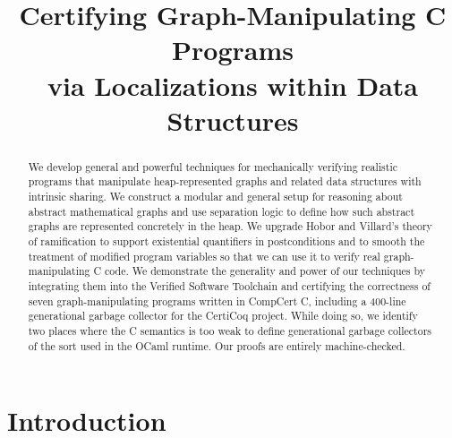 \documentclass[sigplan,10pt,anonymous]{acmart}\settopmatter{printfolios=true,printccs=false,printacmref=false}
\begin{document}
\setlength{\pdfpageheight}{\paperheight}
\setlength{\pdfpagewidth}{\paperwidth}

%
%

\title{Certifying Graph-Manipulating C Programs \\ via Localizations within Data Structures}

\begin{abstract}
We develop general and powerful techniques for mechanically verifying realistic programs that 
manipulate heap-represented graphs and related data structures with intrinsic sharing.
We construct a modular and general setup for reasoning about abstract mathematical graphs
and use separation logic to define how such abstract graphs are represented concretely in 
the heap.  We upgrade Hobor and Villard's theory of ramification to support existential 
quantifiers in postconditions and to smooth the treatment of modified program variables
so that we can use it to verify real graph-manipulating C code.  We demonstrate the generality 
and power of our techniques by integrating them into the Verified Software Toolchain and
certifying the correctness of seven graph-manipulating programs written in CompCert C, including 
a 400-line generational garbage collector for the CertiCoq project.  While doing so, we identify
two places where the C semantics is too weak to define generational garbage collectors of the 
sort used in the OCaml runtime.  Our proofs are entirely machine-checked.
\end{abstract}

\maketitle


\section{Introduction}
\label{sec:intro}
\end{document}

